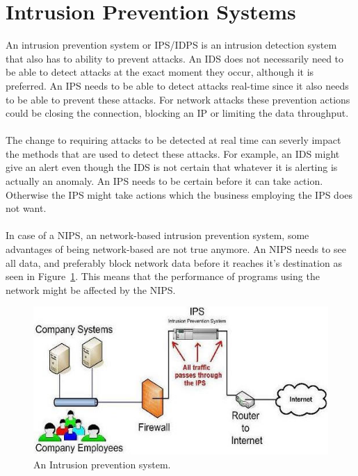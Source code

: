 \section{Intrusion Prevention Systems}
An intrusion prevention system or IPS/IDPS is an intrusion detection system that also has to ability to prevent attacks. An IDS does not necessarily need to be able to detect attacks at the exact moment they occur, although it is preferred. An IPS needs to be able to detect attacks real-time since it also needs to be able to prevent these attacks. For network attacks these prevention actions could be closing the connection, blocking an IP or limiting the data throughput.  \cite{sans2}\\
\\
The change to requiring attacks to be detected at real time can severly impact the methods that are used to detect these attacks. For example, an IDS might give an alert even though the IDS is not certain that whatever it is alerting is actually an anomaly. An IPS needs to be certain before it can take action. Otherwise the IPS might take actions which the business employing the IPS does not want.  \cite{sans2}\\
\\
In case of a NIPS, an network-based intrusion prevention system, some advantages of being network-based are not true anymore. An NIPS needs to see all data, and preferably block network data before it reaches it's destination as seen in Figure~\ref{fig:IPS}. This means that the performance of programs using the network might be affected by the NIPS. \cite{golling2014towards}

\begin{figure}[H]
\centering
\includegraphics[width=1\textwidth]{Figures/IDS_IPS}
\decoRule
\caption[Intrusion prevention system]{An Intrusion prevention system. \cite{ips1}}
\label{fig:IPS}
\end{figure}

